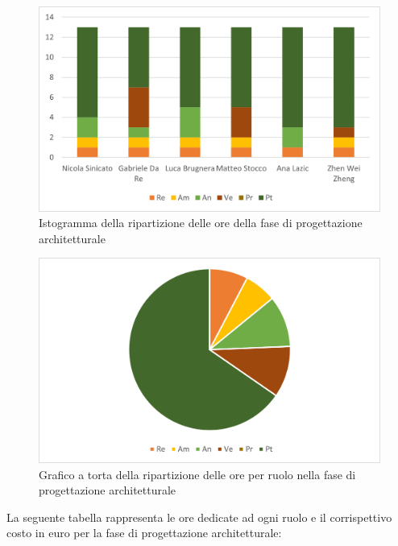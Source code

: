 \begin{figure}[H]
    \centering
    \includegraphics[scale=0.6]{img/grafi preventivo/istogrammi/architetturale/complessivo.png}
    \caption{Istogramma della ripartizione delle ore della fase di progettazione architetturale}
\end{figure}
\begin{figure}[H]
    \centering
    \includegraphics[scale=0.6]{img/grafi preventivo/torta/architetturale/complessivo.png}
    \caption{Grafico a torta della ripartizione delle ore per ruolo nella fase di progettazione architetturale}
\end{figure}
La seguente tabella rappresenta le ore dedicate ad ogni ruolo e il corrispettivo costo in euro per la fase di progettazione architetturale:

